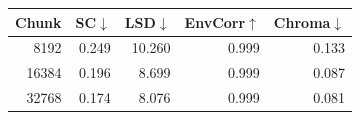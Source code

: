 \begin{tabular}{rrrrr}
\toprule
Chunk & SC$\downarrow$ & LSD$\downarrow$ & EnvCorr$\uparrow$ & Chroma$\downarrow$ \\
\midrule
8192 & 0.249 & 10.260 & 0.999 & 0.133 \\
16384 & 0.196 & 8.699 & 0.999 & 0.087 \\
32768 & 0.174 & 8.076 & 0.999 & 0.081 \\
\bottomrule
\end{tabular}
